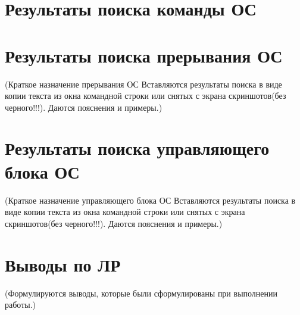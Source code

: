 \documentclass[bachelor,subf,12pt]{disser}
\begin{document}
\section{Результаты поиска команды ОС}


\section{Результаты поиска прерывания ОС}
(Краткое назначение прерывания ОС Вставляются результаты поиска в виде копии текста из
окна командной строки или снятых с экрана скриншотов(без черного!!!). Даются пояснения и
примеры.)

\section{Результаты поиска управляющего блока ОС}
(Краткое назначение управляющего блока ОС Вставляются результаты поиска в виде копии
текста из окна командной строки или снятых с экрана скриншотов(без черного!!!). Даются
пояснения и примеры.)

\section{Выводы по ЛР}
 (Формулируются выводы, которые были сформулированы при выполнении работы.)
\end{document}
